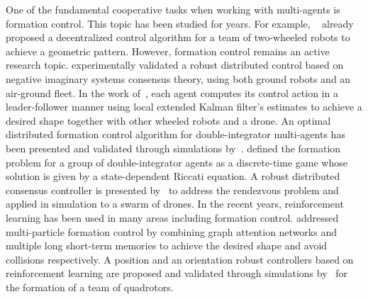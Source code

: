 \documentclass{ifacconf}
\begin{document}
One of the fundamental cooperative tasks when working with multi-agents is formation
control.
This topic has been studied for years.
For example, ~\cite{LEE200985} already proposed
a decentralized control algorithm for a team of two-wheeled robots 
to achieve a geometric pattern.
However, formation control remains an active research topic.
\cite{TRAN2021100117} experimentally validated a robust distributed control 
based on negative imaginary systems consensus theory, using both ground robots and
an air-ground fleet.
In the work of~\cite{GULER2023105492}, each agent computes its control action 
in a leader-follower manner using local extended Kalman filter's estimates to 
achieve a desired shape together with other wheeled robots and a drone.
An optimal distributed formation control algorithm for double-integrator multi-agents
has been presented and validated through simulations by~\cite{Huang2023}.
\cite{Aditya2023} defined the formation problem for a group of double-integrator agents 
as a discrete-time game whose solution is given by a state-dependent Riccati equation.
A robust distributed consensus controller is presented by~\cite{Restrepo2023}
to address the rendezvous problem and applied in simulation to a swarm of drones.
In the recent years, reinforcement learning has been used in many areas including 
formation control. 
\cite{WANG20208150} addressed multi-particle formation control by combining 
graph attention networks and multiple long short-term memories to achieve the 
desired shape and avoid collisions respectively.
A position and an orientation robust controllers based on reinforcement learning 
are proposed and validated through simulations by~\cite{Zhong2025} for the formation 
of a team of quadrotors.
\end{document}
